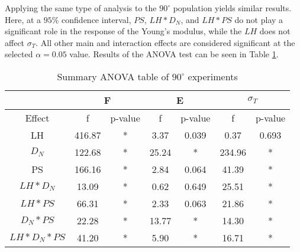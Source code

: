 \documentclass[main.tex]{subfiles}
\begin{document}
Applying the same type of analysis to the $90^{\circ}$ population yields similar results. Here, at a $95\%$ confidence interval, $PS$, $LH*D_{N}$, and $LH*PS$ do not play a significant role in the response of the Young's modulus, while the $LH$ does not affect $\sigma_{T}$. All other main and interaction effects are considered significant at the selected $\alpha = 0.05$ value. Results of the ANOVA test can be seen in Table \ref{tab:anova_90}.

\begin{table}[]
	\renewcommand{\arraystretch}{1.5}
	\centering
	\caption{Summary ANOVA table of $90^{\circ}$ experiments}
	\label{tab:anova_90}
	\begin{tabular}{ccccccc}
		\hline
		& \multicolumn{2}{c}{F}                 & \multicolumn{2}{c}{E}                & \multicolumn{2}{c}{$\sigma_{T}$} \\ \hline
		\multicolumn{1}{c|}{Effect}        & f      & \multicolumn{1}{c|}{p-value} & f     & \multicolumn{1}{c|}{p-value} & f              & p-value         \\
		\multicolumn{1}{c|}{LH}            & 416.87 & \multicolumn{1}{c|}{*}       & 3.37  & \multicolumn{1}{c|}{0.039}   & 0.37           & 0.693           \\
		\multicolumn{1}{c|}{$D_{N}$}       & 122.68 & \multicolumn{1}{c|}{*}       & 25.24 & \multicolumn{1}{c|}{*}       & 234.96         & *               \\
		\multicolumn{1}{c|}{PS}            & 166.16 & \multicolumn{1}{c|}{*}       & 2.84  & \multicolumn{1}{c|}{0.064}   & 41.39          & *               \\
		\multicolumn{1}{c|}{$LH*D_{N}$}    & 13.09  & \multicolumn{1}{c|}{*}       & 0.62  & \multicolumn{1}{c|}{0.649}   & 25.51          & *               \\
		\multicolumn{1}{c|}{$LH*PS$}       & 66.31  & \multicolumn{1}{c|}{*}       & 2.33  & \multicolumn{1}{c|}{0.063}   & 21.86          & *               \\
		\multicolumn{1}{c|}{$D_{N}*PS$}    & 22.28  & \multicolumn{1}{c|}{*}       & 13.77 & \multicolumn{1}{c|}{*}       & 14.30          & *               \\
		\multicolumn{1}{c|}{$LH*D_{N}*PS$} & 41.20  & \multicolumn{1}{c|}{*}       & 5.90  & \multicolumn{1}{c|}{*}       & 16.71          & *               \\ \hline
	\end{tabular}
\end{table} 
\end{document}
